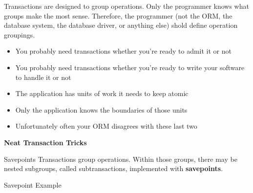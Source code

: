 \documentclass[svgnames]{beamer}
\begin{document}
\begin{frame}
    Transactions are designed to group operations. Only the programmer knows
    what groups make the most sense. Therefore, the programmer (not the ORM,
    the database system, the database driver, or anything else) shold define
    operation groupings.
    \begin{itemize}
        \item You probably need transactions whether you're ready to admit it
        or not
        \item You probably need transactions whether you're ready to write
        your software to handle it or not
        \item The application has units of work it needs to keep atomic
        \item Only the application knows the boundaries of those units
        \item Unfortunately often your ORM disagrees with these last two
    \end{itemize}
\end{frame}

\begin{frame}
    \begin{centering}
        \textbf{Neat Transaction Tricks}
        \par
    \end{centering}
\end{frame}

\begin{frame}{Savepoints}
    Transactions group operations. Within those groups, there may be nested
    subgroups, called subtransactions, implemented with \textbf{savepoints}.
\end{frame}

\begin{frame}{Savepoint Example}
\end{frame}
\end{document}
